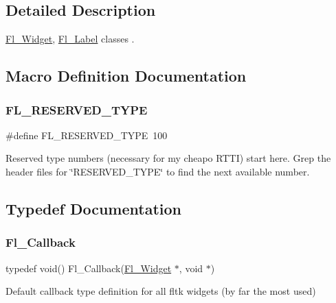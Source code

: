 \subsection{Detailed Description}
\hyperlink{class_fl___widget}{Fl\+\_\+\+Widget}, \hyperlink{struct_fl___label}{Fl\+\_\+\+Label} classes . 

\subsection{Macro Definition Documentation}
\mbox{\label{_fl___widget_8_h_ad300ac1cbbe7744c87fc376ce0eb9cc7}} 
\subsubsection{\texorpdfstring{F\+L\+\_\+\+R\+E\+S\+E\+R\+V\+E\+D\+\_\+\+T\+Y\+PE}{FL\_RESERVED\_TYPE}}
{\footnotesize\ttfamily \#define F\+L\+\_\+\+R\+E\+S\+E\+R\+V\+E\+D\+\_\+\+T\+Y\+PE~100}

Reserved type numbers (necessary for my cheapo R\+T\+TI) start here. Grep the header files for \char`\"{}\+R\+E\+S\+E\+R\+V\+E\+D\+\_\+\+T\+Y\+P\+E\char`\"{} to find the next available number. 

\subsection{Typedef Documentation}
\mbox{\label{_fl___widget_8_h_a640bea0193560eec20903c45c93c7472}} 
\subsubsection{\texorpdfstring{Fl\+\_\+\+Callback}{Fl\_Callback}}
{\footnotesize\ttfamily typedef void() Fl\+\_\+\+Callback(\hyperlink{class_fl___widget}{Fl\+\_\+\+Widget} $\ast$, void $\ast$)}

Default callback type definition for all fltk widgets (by far the most used) \mbox{\label{_fl___widget_8_h_a6ce47be89b1f24ea198fd2c93951969e}} 
